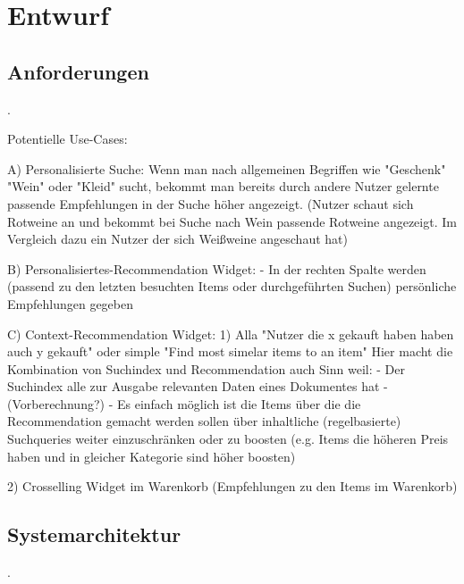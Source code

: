 \section{Entwurf}

\subsection{Anforderungen}\newpage.\newpage

Potentielle Use-Cases:

A) Personalisierte Suche:
  Wenn man nach allgemeinen Begriffen wie "Geschenk" "Wein" oder "Kleid" sucht, bekommt man bereits durch andere Nutzer gelernte passende Empfehlungen in der Suche höher angezeigt.
  (Nutzer schaut sich Rotweine an und bekommt bei Suche nach Wein passende Rotweine angezeigt. Im Vergleich dazu ein Nutzer der sich Weißweine angeschaut hat)

B) Personalisiertes-Recommendation Widget:
 - In der rechten Spalte werden (passend zu den letzten besuchten Items oder durchgeführten Suchen) persönliche Empfehlungen gegeben


C) Context-Recommendation Widget:
1) Alla "Nutzer die x gekauft haben haben auch y gekauft" oder simple "Find most simelar items to an item"
Hier macht die Kombination von Suchindex und Recommendation auch Sinn weil:
- Der Suchindex alle zur Ausgabe relevanten Daten eines Dokumentes hat
- (Vorberechnung?)
- Es einfach möglich ist die Items über die die Recommendation gemacht werden sollen über inhaltliche (regelbasierte) Suchqueries weiter einzuschränken oder zu boosten (e.g. Items die höheren Preis haben und in gleicher Kategorie sind höher boosten)

2) Crosselling Widget im Warenkorb (Empfehlungen zu den Items im Warenkorb)



\subsection{Systemarchitektur}\newpage.\newpage



